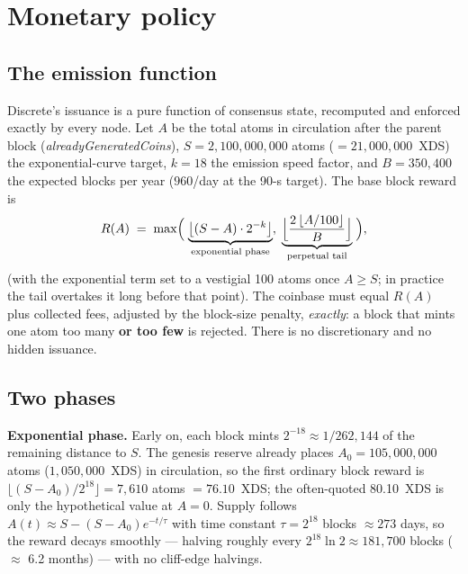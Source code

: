 \documentclass[11pt,a4paper]{article}
\begin{document}
\section{Monetary policy}\label{sec:monetary}

\subsection{The emission function}

Discrete's issuance is a pure function of consensus state, recomputed and
enforced exactly by every node. Let $A$ be the total atoms in circulation
after the parent block (\emph{alreadyGeneratedCoins}), $S =
2{,}100{,}000{,}000$ atoms ($= 21{,}000{,}000$~XDS) the exponential-curve
target, $k = 18$ the emission speed factor, and $B = 350{,}400$ the expected
blocks per year ($960$/day at the 90-s target). The base block reward is
\begin{equation}
R(A) \;=\; \max\Bigl(\;
\underbrace{\bigl\lfloor (S - A) \cdot 2^{-k} \bigr\rfloor}_{\text{exponential phase}}
,\;
\underbrace{\Bigl\lfloor \frac{2\,\lfloor A/100\rfloor}{B} \Bigr\rfloor}_{\text{perpetual tail}}
\;\Bigr),
\label{eq:emission}
\end{equation}
(with the exponential term set to a vestigial 100 atoms once $A \ge S$;
in practice the tail overtakes it long before that point). The coinbase must
equal $R(A)$ plus collected fees, adjusted by the block-size penalty,
\emph{exactly}: a block that mints one atom too many \textbf{or too few} is
rejected. There is no discretionary and no hidden issuance.

\subsection{Two phases}

\textbf{Exponential phase.} Early on, each block mints
$2^{-18} \approx 1/262{,}144$ of the remaining distance to $S$. The genesis
reserve already places $A_0=105{,}000{,}000$ atoms
($1{,}050{,}000$~XDS) in circulation, so the first
ordinary block reward is $\lfloor(S-A_0)/2^{18}\rfloor = 7{,}610$ atoms
$=76.10$~XDS; the often-quoted 80.10~XDS is only the hypothetical value at
$A=0$. Supply follows $A(t) \approx S-(S-A_0)e^{-t/\tau}$ with time constant
$\tau = 2^{18}$ blocks $\approx 273$ days, so the reward decays smoothly ---
halving roughly every $2^{18}\ln 2 \approx 181{,}700$ blocks
($\approx$ 6.2 months) --- with no cliff-edge halvings.
\end{document}
